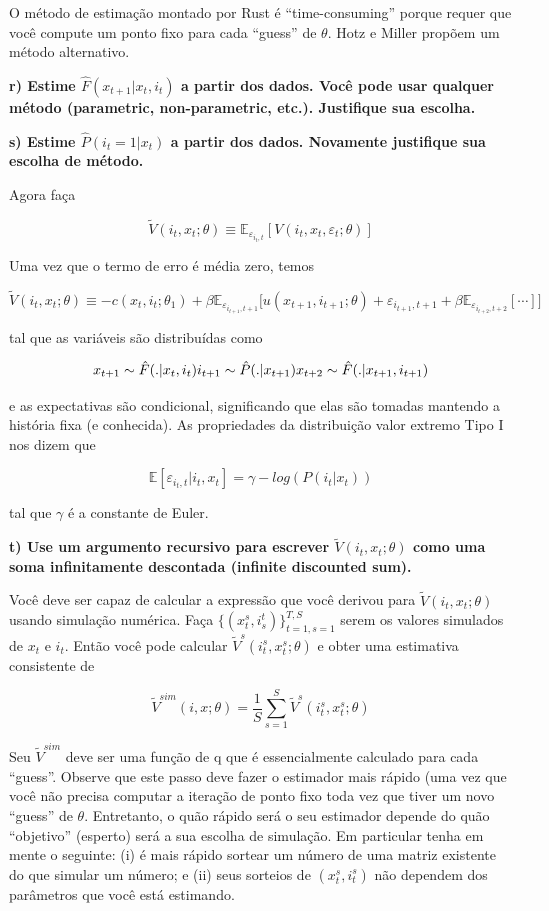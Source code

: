 \documentclass[12pt,a4paper]{article}
\begin{document}
O método de estimação montado por Rust é ``time-consuming'' porque
requer que você compute um ponto fixo para cada ``guess'' de \(\theta\).
Hotz e Miller propõem um método alternativo.

\textbf{r) Estime \(\hat{F}(x_{t+1}|x_t,i_t)\) a partir dos dados. Você
pode usar qualquer método (parametric, non-parametric, etc.). Justifique
sua escolha.}

\textbf{s) Estime \(\hat{P}(i_t=1|x_t)\) a partir dos dados. Novamente
justifique sua escolha de método.}

Agora faça

\[
\tilde{V} (i_t,x_t;\theta) \equiv \mathbb{E}_{\varepsilon_{i_{t},t}}[V(i_t,x_t,\varepsilon_t;\theta)]
\]

Uma vez que o termo de erro é média zero, temos

\[
\tilde{V} (i_t,x_t;\theta) \equiv -c(x_t,i_t;\theta_1) + \beta \mathbb{E}_{\varepsilon_{i_{t+1},t+1}}\Big[u(x_{t+1},i_{t+1};\theta)+\varepsilon_{i_{t+1},t+1}+\beta\mathbb{E}_{\varepsilon_{i_{t+2},t+2}}[\cdots]\Big]
\]

tal que as variáveis são distribuídas como

\[
x_{t+1} \sim \hat{F}(.|x_t,i_t) \\
i_{t+1} \sim \hat{P}(.|x_{t+1}) \\
x_{t+2} \sim \hat{F}(.|x_{t+1},i_{t+1}) \\
\]

e as expectativas são condicional, significando que elas são tomadas
mantendo a história fixa (e conhecida). As propriedades da distribuição
valor extremo Tipo I nos dizem que

\[
\mathbb{E}[\varepsilon_{i_{t},t}|i_t,x_t] = \gamma - log(P(i_t|x_t))
\]

tal que \(\gamma\) é a constante de Euler.

\textbf{t) Use um argumento recursivo para escrever
\(\tilde{V}(i_t,x_t;\theta)\) como uma soma infinitamente descontada
(infinite discounted sum).}

Você deve ser capaz de calcular a expressão que você derivou para
\(\tilde{V}(i_t,x_t;\theta)\) usando simulação numérica. Faça
\(\{(x_t^s,i_s^t)\}_{t=1,s=1}^{T,S}\) serem os valores simulados de
\(x_t\) e \(i_t\). Então você pode calcular
\(\tilde{V}^s(i_t^s,x_t^s;\theta)\) e obter uma estimativa consistente
de

\[
\tilde{V}^{sim}(i,x;\theta)=\frac{1}{S}\sum_{s=1}^S \tilde{V}^s(i_t^s,x_t^s;\theta)
\]

Seu \(\tilde{V}^{sim}\) deve ser uma função de q que é essencialmente
calculado para cada ``guess''. Observe que este passo deve fazer o
estimador mais rápido (uma vez que você não precisa computar a iteração
de ponto fixo toda vez que tiver um novo ``guess'' de \(\theta\).
Entretanto, o quão rápido será o seu estimador depende do quão
``objetivo'' (esperto) será a sua escolha de simulação. Em particular
tenha em mente o seguinte: (i) é mais rápido sortear um número de uma
matriz existente do que simular um número; e (ii) seus sorteios de
\((x_t^s , i_t^s )\) não dependem dos parâmetros que você está
estimando.
\end{document}
